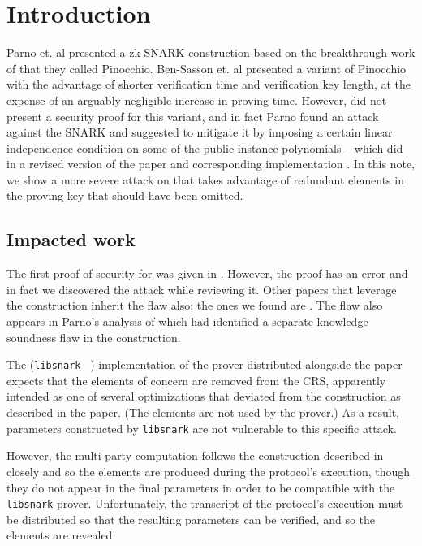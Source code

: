 \documentclass[11pt]{article}
\numberwithin{figure}{section} %
\begin{document}
\section{Introduction}

Parno et. al \cite{PGHR} presented a zk-SNARK construction based on the breakthrough work of \cite{GGPR} that they called Pinocchio.
Ben-Sasson et. al \cite{BCTV} presented a variant of Pinocchio with the advantage of shorter verification time and verification key length, at the expense of an arguably negligible increase in proving time. However, \cite{BCTV} did not present a security proof for this variant, and in fact Parno \cite{Parno15} found an attack against the \cite{BCTV} SNARK and suggested to mitigate it by imposing a certain linear independence condition on some of the public instance polynomials -- which \cite{BCTV} did in a revised version of the paper and corresponding implementation \cite{libsnark}. In this note, we show a more severe attack on \cite{BCTV} that takes advantage of redundant elements in the proving key that should have been omitted.


\subsection{Impacted work}
The first proof of security for \cite{BCTV} was given in \cite{BGG}. However, the proof has an error and in fact we discovered the attack while reviewing it.
Other papers that leverage the \cite{BCTV} construction inherit the flaw also; the ones we found are \cite{Adsnark,Fuchsbauer18}. The flaw also appears in Parno's \cite{Parno15} analysis of \cite{BCTV} which had identified a separate knowledge soundness flaw in the construction.

The (\texttt{libsnark} ~\cite{libsnark}) implementation of the \cite{BCTV} prover distributed alongside the paper expects that the elements of concern are removed from the CRS, apparently intended as one of several optimizations that deviated from the construction as described in the paper. (The elements are not used by the prover.) As a result, parameters constructed by \texttt{libsnark} are not vulnerable to this specific attack.

However, the multi-party computation \cite{BGG} follows the construction described in \cite{BCTV} closely and so the elements are produced during the protocol's execution, though they do not appear in the final parameters in order to be compatible with the \texttt{libsnark} prover. Unfortunately, the transcript of the protocol's execution must be distributed so that the resulting parameters can be verified, and so the elements are revealed.
\end{document}
